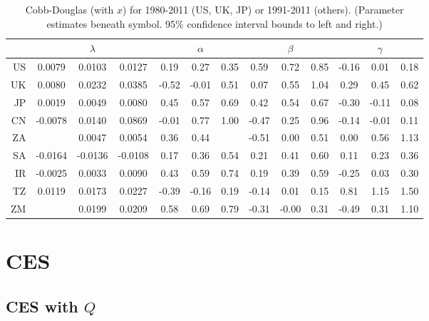 \documentclass[preprint,authoryear,12pt]{elsarticle}\usepackage{graphicx, color}
\begin{document}
\begin{table}[ht]
\begin{center}
\caption{Cobb-Douglas (with $x$) for 1980-2011 (US, UK, JP) or 1991-2011 (others). (Parameter estimates beneath symbol. 95\% confidence interval bounds to left and right.)}
{\tiny
\begin{tabular}{r|ccc|ccc|ccc|ccc}
  \hline
 &   & $\lambda$ &   &   & $\alpha$ &   &   & $\beta$ &   &   & $\gamma$ &   \\ 
  \hline
US & 0.0079 & 0.0103 & 0.0127 & 0.19 & 0.27 & 0.35 & 0.59 & 0.72 & 0.85 & -0.16 & 0.01 & 0.18 \\ 
  UK & 0.0080 & 0.0232 & 0.0385 & -0.52 & -0.01 & 0.51 & 0.07 & 0.55 & 1.04 & 0.29 & 0.45 & 0.62 \\ 
  JP & 0.0019 & 0.0049 & 0.0080 & 0.45 & 0.57 & 0.69 & 0.42 & 0.54 & 0.67 & -0.30 & -0.11 & 0.08 \\ 
  CN & -0.0078 & 0.0140 & 0.0869 & -0.01 & 0.77 & 1.00 & -0.47 & 0.25 & 0.96 & -0.14 & -0.01 & 0.11 \\ 
  ZA &  & 0.0047 & 0.0054 & 0.36 & 0.44 &  & -0.51 & 0.00 & 0.51 & 0.00 & 0.56 & 1.13 \\ 
  SA & -0.0164 & -0.0136 & -0.0108 & 0.17 & 0.36 & 0.54 & 0.21 & 0.41 & 0.60 & 0.11 & 0.23 & 0.36 \\ 
  IR & -0.0025 & 0.0033 & 0.0090 & 0.43 & 0.59 & 0.74 & 0.19 & 0.39 & 0.59 & -0.25 & 0.03 & 0.30 \\ 
  TZ & 0.0119 & 0.0173 & 0.0227 & -0.39 & -0.16 & 0.19 & -0.14 & 0.01 & 0.15 & 0.81 & 1.15 & 1.50 \\ 
  ZM &  & 0.0199 & 0.0209 & 0.58 & 0.69 & 0.79 & -0.31 & -0.00 & 0.31 & -0.49 & 0.31 & 1.10 \\ 
   \hline
\end{tabular}
}
\end{center}
\end{table}



\section{CES}




\subsection{CES with $Q$}
\end{document}
